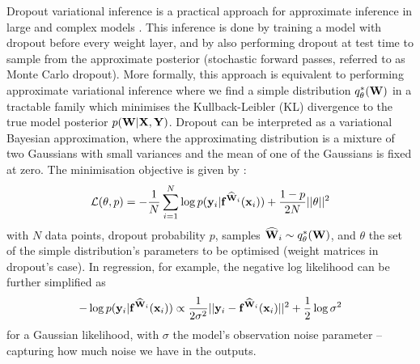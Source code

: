 Dropout variational inference is a practical approach for approximate inference in large and complex models \citep{Gal2016Bayesian}. 
This inference is done by training a model with dropout before every weight layer, and by also performing dropout at test time to sample from the approximate posterior (stochastic forward passes, referred to as Monte Carlo dropout).
More formally, this approach is equivalent to performing approximate variational inference where we find a simple distribution $q_\theta^*(\mathbf{W})$ in a tractable family which minimises the Kullback-Leibler (KL) divergence to the true model posterior $p(\mathbf{W} | \mathbf{X}, \mathbf{Y})$. 
Dropout can be interpreted as a variational Bayesian approximation, where the approximating distribution is a mixture of two Gaussians with small variances and the mean of one of the Gaussians is fixed at zero. 
%
The minimisation objective is given by \citep{jordan1999introduction}:
\begin{equation}  
\mathcal{L}(\theta, p) = - \frac{1}{N} \sum_{i=1}^N \log p(\mathbf{y}_i | \mathbf{f}^{{\widehat{\mathbf{W}}}_i}(\mathbf{x}_i)) + \frac{1 - p}{2N} ||\theta||^2
\end{equation}
with $N$ data points, dropout probability $p$, samples ${\widehat{\mathbf{W}}}_i \sim q_\theta^*(\mathbf{W})$, and $\theta$ the set of the simple distribution's parameters to be optimised (weight matrices in dropout's case). In regression, for example, the negative log likelihood can be further simplified as
\begin{equation}
-\log p(\mathbf{y}_i | \mathbf{f}^{{\widehat{\mathbf{W}}}_i}(\mathbf{x}_i)) \propto  \frac{1}{2 \sigma^2}||\mathbf{y}_i - \mathbf{f}^{{\widehat{\mathbf{W}}}_i}(\mathbf{x}_i)||^2 + \frac{1}{2} \log \sigma^2
\end{equation}
for a Gaussian likelihood,
with $\sigma$ the model's observation noise parameter -- capturing how much noise we have in the outputs.

